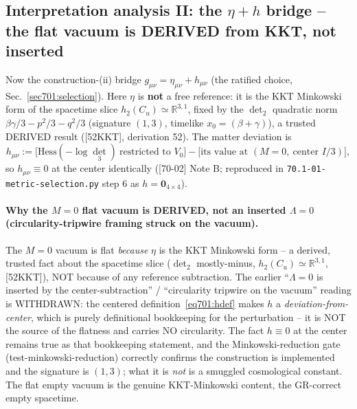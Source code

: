 \subsection{Interpretation analysis II: the $\eta+h$ bridge -- the flat vacuum is
            DERIVED from KKT, not inserted}
\label{sec701:circularity}

Now the construction-(ii) bridge $g_{\mu\nu}=\eta_{\mu\nu}+h_{\mu\nu}$ (the ratified
choice, Sec.~\ref{sec701:selection}). Here $\eta$ is \textbf{not} a free reference: it is
the KKT Minkowski form of the spacetime slice $h_2(C_u)\simeq\mathbb{R}^{3,1}$, fixed by
the $\det_2$ quadratic norm $\beta\gamma/3-p^2/3-q^2/3$ (signature $(1,3)$, timelike
$x_0=(\beta+\gamma)$), a trusted DERIVED result ([52KKT], derivation 52). The matter
deviation is
\begin{equation}
  h_{\mu\nu} := \big[\mathrm{Hess}(-\log\det_3)\ \text{restricted to } V_0\big]
              - \big[\text{its value at } (M{=}0,\ \text{center } I/3)\big],
  \label{eq701:hdef}
\end{equation}
so $h_{\mu\nu}\equiv0$ at the center identically ([70-02] Note B; reproduced in
\texttt{70.1-01-metric-selection.py} step 6 as $h=\mathbf{0}_{4\times4}$).

\paragraph{Why the $M=0$ flat vacuum is DERIVED, not an inserted $\Lambda=0$
(circularity-tripwire framing struck on the vacuum).} The $M=0$ vacuum is flat
\emph{because} $\eta$ is the KKT Minkowski form -- a derived, trusted fact about the
spacetime slice ($\det_2$ mostly-minus, $h_2(C_u)\simeq\mathbb{R}^{3,1}$, [52KKT]), NOT
because of any reference subtraction. The earlier ``$\Lambda=0$ is inserted by the
center-subtraction'' / ``circularity tripwire on the vacuum'' reading is WITHDRAWN: the
centered definition~\eqref{eq701:hdef} makes $h$ a \emph{deviation-from-center}, which is
purely definitional bookkeeping for the perturbation -- it is NOT the source of the
flatness and carries NO circularity. The fact $h\equiv0$ at the center remains true as
that bookkeeping statement, and the Minkowski-reduction gate (test-minkowski-reduction)
correctly confirms the construction is implemented and the signature is $(1,3)$; what it
is \emph{not} is a smuggled cosmological constant. The flat empty vacuum is the genuine
KKT-Minkowski content, the GR-correct empty spacetime.

